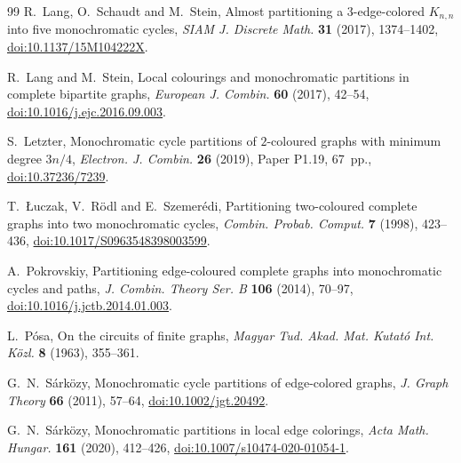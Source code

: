 \documentclass[a4paper,12pt,reqno]{amsart}
\begin{document}
\begin{thebibliography}{99}
R.~Lang, O.~Schaudt and M.~Stein,
\newblock Almost partitioning a $3$-edge-colored $K_{n,n}$ into five
  monochromatic cycles,
\newblock \emph{SIAM J. Discrete Math.} \textbf{31} (2017), 1374--1402,
\newblock \href{https://doi.org/10.1137/15M104222X}{doi:10.1137/15M104222X}.

R.~Lang and M.~Stein,
\newblock Local colourings and monochromatic partitions in complete
  bipartite graphs,
\newblock \emph{European J. Combin.} \textbf{60} (2017), 42--54,
\newblock \href{https://doi.org/10.1016/j.ejc.2016.09.003}{doi:10.1016/j.ejc.2016.09.003}.

S.~Letzter,
\newblock Monochromatic cycle partitions of $2$-coloured graphs with minimum
  degree $3n/4$,
\newblock \emph{Electron. J. Combin.} \textbf{26} (2019), Paper P1.19, 67~pp.,
\newblock \href{https://doi.org/10.37236/7239}{doi:10.37236/7239}.

T.~\L{}uczak, V.~R\"odl and E.~Szemer\'edi,
\newblock Partitioning two-coloured complete graphs into two monochromatic
  cycles,
\newblock \emph{Combin. Probab. Comput.} \textbf{7} (1998), 423--436,
\newblock \href{https://doi.org/10.1017/S0963548398003599}{doi:10.1017/S0963548398003599}.

A.~Pokrovskiy,
\newblock Partitioning edge-coloured complete graphs into monochromatic
  cycles and paths,
\newblock \emph{J. Combin. Theory Ser. B} \textbf{106} (2014), 70--97,
\newblock \href{https://doi.org/10.1016/j.jctb.2014.01.003}{doi:10.1016/j.jctb.2014.01.003}.

L.~P\'osa,
\newblock On the circuits of finite graphs,
\newblock \emph{Magyar Tud. Akad. Mat. Kutat\'o Int. K\"ozl.}
  \textbf{8} (1963), 355--361.

G.~N.~S\'ark\"ozy,
\newblock Monochromatic cycle partitions of edge-colored graphs,
\newblock \emph{J. Graph Theory} \textbf{66} (2011), 57--64,
\newblock \href{https://doi.org/10.1002/jgt.20492}{doi:10.1002/jgt.20492}.

G.~N.~S\'ark\"ozy,
\newblock Monochromatic partitions in local edge colorings,
\newblock \emph{Acta Math. Hungar.} \textbf{161} (2020), 412--426,
\newblock \href{https://doi.org/10.1007/s10474-020-01054-1}{doi:10.1007/s10474-020-01054-1}.

\end{thebibliography}
\end{document}
